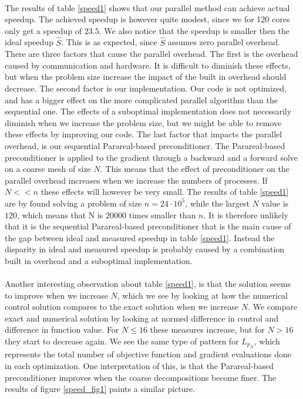 \noindent
\\
The results of table \ref{speed1} shows that our parallel method can achieve actual speedup. The achieved speedup is however quite modest, since we for 120 cores only get a speedup of $23.5$. We also notice that the speedup is smaller then the ideal speedup $\hat S$. This is as expected, since $\hat S$ assumes zero parallel overhead. There are three factors that cause the parallel overhead. The first is the overhead caused by communication and hardware. It is difficult to diminish these effects, but when the problem size increase the impact of the built in overhead should decrease. The second factor is our implementation. Our code is not optimized, and has a bigger effect on the more complicated parallel algorithm than the sequential one. The effects of a suboptimal implementation does not necessarily diminish when we increase the problem size, but we might be able to remove these effects by improving our code. The last factor that impacts the parallel overhead, is our sequential Parareal-based preconditioner. The Parareal-based preconditioner is applied to the gradient through a backward and a forward solve on a coarse mesh of size $N$. This means that the effect of preconditioner on the parallel overhead increases when we increase the numbers of processes. If $N<<n$ these effects will however be very small. The results of table \ref{speed1} are by found solving a problem of size $n=24\cdot 10^5$, while the largest $N$ value is $120$, which means that N is $20000$ times smaller than $n$. It is therefore unlikely that it is the sequential Parareal-based preconditioner that is the main cause of the gap between ideal and measured speedup in table \ref{speed1}. Instead the disparity in ideal and measured speedup is probably caused by a combination built in overhead and a suboptimal implementation.
\\
\\
Another interesting observation about table \ref{speed1}, is that the solution seems to improve when we increase $N$, which we see by looking at how the numerical control solution compares to the exact solution when we increase $N$. We compare exact and numerical solution by looking at normed difference in control and difference in function value. For $N\leq16$ these measures increase, but for $N>16$ they start to decrease again. We see the same type of pattern for $L_{p_N}$, which represents the total number of objective function and gradient evaluations done in each optimization. One interpretation of this, is that the Parareal-based preconditioner improves when the coarse decompositions become finer. The results of figure \ref{speed_fig1} paints a similar picture.

